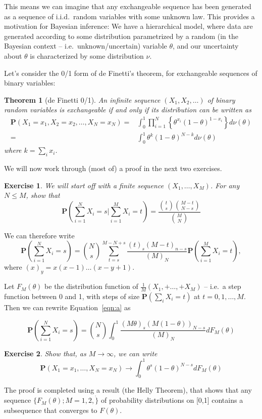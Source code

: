\documentclass[twoside]{article}
\newcounter{lecnum}
\newtheorem{theorem}{Theorem}[lecnum]
\newtheorem{exercise}{Exercise}[lecnum]
\newcommand\Prob{\mathbf{P}}
\begin{document}
This means we can imagine that any exchangeable sequence has been generated as a sequence of i.i.d.\ random variables with some unknown law. This provides a motivation for Bayesian inference: We have a hierarchical model, where data are generated according to some distribution parametrized by a random (in the Bayesian context -- i.e.\ unknown/uncertain) variable $\theta$, and our uncertainty about $\theta$ is characterized by some distribution $\nu$.

Let's consider the 0/1 form of de Finetti's theorem, for exchangeable sequences of binary variables:


\begin{theorem}[de Finetti 0/1]
  An infinite sequence $(X_1,X_2,\dots)$ of binary random variables is exchangeable if and only if its distribution can be written as
  $$\begin{aligned}\Prob(X_1=x_1,X_2=x_2,\dots, X_N=x_N)  =& \int_0^1\prod_{i=1}^N\left\{\theta^{x_i}(1-\theta)^{1-x_i}\right\} d\nu(\theta)\\
    =&\int_0^1 \theta^{k}(1-\theta)^{N-k} d\nu(\theta)\end{aligned}$$
  where $k=\sum_ix_i$.
\end{theorem}

We will now work through (most of) a proof in the next two exercises.

\begin{exercise}
  We will start off with a finite sequence $(X_1,\dots, X_M)$. For any $N\leq M$, show that
  $$\Prob\left(\sum_{i=1}^N X_i = s\Big|\sum_{i=1}^M X_i = t\right) = \frac{{t\choose s}{M-t\choose N-s}}{{M \choose N}}$$
\end{exercise}
We can therefore write
\begin{equation}\Prob\left(\sum_{i=1}^N X_i = s\right) = {N\choose s}\sum_{t=s}^{M-N+s}\frac{(t)_s(M-t)_{n-s}}{(M)_N}\Prob\left(\sum_{i=1}^M X_i = t\right),\label{eqn:a}\end{equation}
where $(x)_y = x(x-1)\dots (x-y+1)$.

Let $F_M(\theta)$ be the distribution function of $\frac{1}{M}(X_1, + \dots, + X_M)$  --  i.e.\ a step function between 0 and 1, with steps of size $\Prob(\sum_i X_i= t)$ at $t=0,1,\dots, M$. Then we can rewrite Equation~\ref{eqn:a} as

$$\Prob\left(\sum_{i=1}^N X_i = s\right) = {N\choose s}\int_0^1\frac{(M\theta)_s(M(1-\theta))_{N-s}}{(M)_N}dF_M(\theta)$$
\begin{exercise}
  Show that, as $M\rightarrow \infty$, we can write
  $$\Prob\left(X_1 =x_1,\dots, X_N=x_N \right) \rightarrow \int_0^1\theta^s(1-\theta)^{N-s}dF_M(\theta)$$
\end{exercise}
The proof is completed using a result (the Helly Theorem), that shows that any sequence $\{F_M(\theta); M=1,2,\dot\}$ of probability distributions on [0,1] contains a subsequence that converges to $F(\theta)$.
\end{document}
